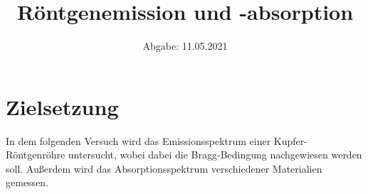 
\usepackage{parskip}

\subject{D602}
\title{Röntgenemission und -absorption}
\date{
    Abgabe: 11.05.2021
}



\maketitle
\thispagestyle{empty}
\tableofcontents
\newpage

\section{Zielsetzung}

    In dem folgenden Versuch wird das Emissionsspektrum einer Kupfer-Röntgenröhre untersucht,
    wobei dabei die Bragg-Bedingung nachgewiesen werden soll.
    Außerdem wird das Absorptionsspektrum verschiedener Materialien gemessen.

\clearpage


\clearpage


\clearpage

%

%

\printbibliography


